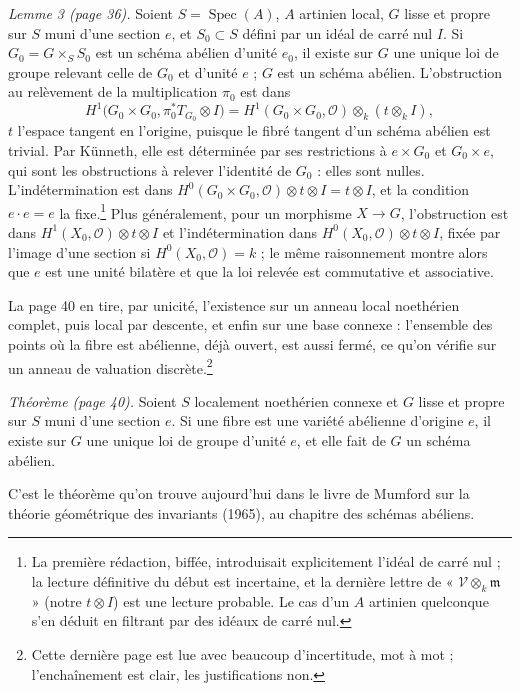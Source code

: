 \documentclass[11pt,a4paper]{article}
\begin{document}
\emph{Lemme 3 (page 36).} Soient $S = \operatorname{Spec}(A)$, $A$ artinien
local, $G$ lisse et propre sur $S$ muni d'une section $e$, et $S_0 \subset S$
défini par un idéal de carré nul $I$. Si $G_0 = G \times_S S_0$ est un schéma
abélien d'unité $e_0$, il existe sur $G$ une unique loi de groupe relevant
celle de $G_0$ et d'unité $e$ ; $G$ est un schéma abélien. L'obstruction au
relèvement de la multiplication $\pi_0$ est dans
\[
H^1\bigl(G_0 \times G_0, \pi_0^*T_{G_0} \otimes I\bigr) = H^1(G_0 \times G_0, \mathcal{O}) \otimes_k (t \otimes_k I) ,
\]
$t$ l'espace tangent en l'origine, puisque le fibré tangent d'un schéma abélien
est trivial. Par Künneth, elle est déterminée par ses restrictions à
$e \times G_0$ et $G_0 \times e$, qui sont les obstructions à relever
l'identité de $G_0$ : elles sont nulles. L'indétermination est dans
$H^0(G_0 \times G_0, \mathcal{O}) \otimes t \otimes I = t \otimes I$, et la
condition $e \cdot e = e$ la fixe.\footnote{La première rédaction, biffée,
introduisait explicitement l'idéal de carré nul ; la lecture définitive du
début est incertaine, et la dernière lettre de « $\mathcal{V} \otimes_k \mathfrak{m}$ »
(notre $t \otimes I$) est une lecture probable. Le cas d'un $A$ artinien
quelconque s'en déduit en filtrant par des idéaux de carré nul.} Plus
généralement, pour un morphisme $X \to G$, l'obstruction est dans
$H^1(X_0, \mathcal{O}) \otimes t \otimes I$ et l'indétermination dans
$H^0(X_0, \mathcal{O}) \otimes t \otimes I$, fixée par l'image d'une section si
$H^0(X_0, \mathcal{O}) = k$ ; le même raisonnement montre alors que $e$ est une
unité bilatère et que la loi relevée est commutative et associative.

La page 40 en tire, par unicité, l'existence sur un anneau local noethérien
complet, puis local par descente, et enfin sur une base connexe : l'ensemble
des points où la fibre est abélienne, déjà ouvert, est aussi fermé, ce qu'on
vérifie sur un anneau de valuation discrète.\footnote{Cette dernière page est
lue avec beaucoup d'incertitude, mot à mot ; l'enchaînement est clair, les
justifications non.}

\emph{Théorème (page 40).} Soient $S$ localement noethérien connexe et $G$ lisse
et propre sur $S$ muni d'une section $e$. Si une fibre est une variété
abélienne d'origine $e$, il existe sur $G$ une unique loi de groupe d'unité $e$,
et elle fait de $G$ un schéma abélien.

C'est le théorème qu'on trouve aujourd'hui dans le livre de Mumford sur la
théorie géométrique des invariants (1965), au chapitre des schémas abéliens.
\end{document}
